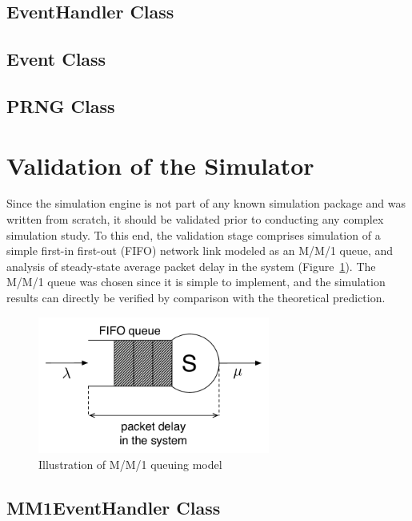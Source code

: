 \subsection{EventHandler Class}
\label{sub:eventhandler_class_simappendix}

\subsection{Event Class}
\label{sub:event_class_simappendix}

\subsection{PRNG Class}
\label{sub:prng_class_simappendix}

\section{Validation of the Simulator}
\label{sec:validation_of_the_simulator_simappendix}
Since the simulation engine is not part of any known simulation package and was written from scratch, it should be validated prior to conducting any complex simulation study. To this end, the validation stage comprises simulation of a simple first-in first-out (FIFO) network link modeled as an M/M/1 queue, and analysis of steady-state average packet delay in the system (Figure~\ref{fig:mm1_queue_simappendix}). The M/M/1 queue was chosen since it is simple to implement, and the simulation results can directly be verified by comparison with the theoretical prediction.

\begin{figure}[t]
	\includegraphics[width=3in]{Appendices/Figures/mm1_queue}
	\caption{Illustration of M/M/1 queuing model}
	\label{fig:mm1_queue_simappendix}
\end{figure}

\subsection{MM1EventHandler Class}
\label{sub:mm1eventhandler_class_simappendix}

